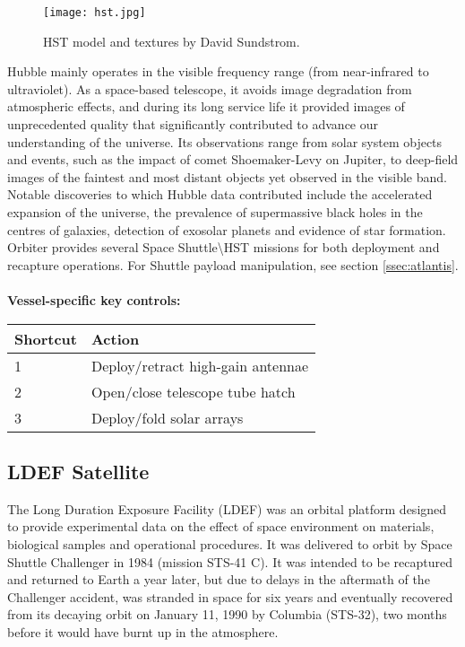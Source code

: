 \documentclass[Orbiter User Manual.tex]{subfiles}
\begin{document}
\begin{figure}[H]
  \centering
  \texttt{[image: hst.jpg]}
  \caption{HST model and textures by David Sundstrom.}
\end{figure}

\noindent
Hubble mainly operates in the visible frequency range (from near-infrared to ultraviolet). As a space-based telescope, it avoids image degradation from atmospheric effects, and during its long service life it provided images of unprecedented quality that significantly contributed to advance our understanding of the universe. Its observations range from solar system objects and events, such as the impact of comet Shoemaker-Levy on Jupiter, to deep-field images of the faintest and most distant objects yet observed in the visible band. Notable discoveries to which Hubble data contributed include the accelerated expansion of the universe, the prevalence of supermassive black holes in the centres of galaxies, detection of exosolar planets and evidence of star formation.\\
Orbiter provides several Space Shuttle\textbackslash HST missions for both deployment and recapture operations. For Shuttle payload manipulation, see section \ref{ssec:atlantis}.\\
\\
\textbf{Vessel-specific key controls:}

	\begin{longtable}{ |p{}|p{}| }
	\hline\rule{0pt}{2ex}
	\textbf{Shortcut} & \textbf{Action}\\
	\hline\rule{0pt}{2ex}
	1 & Deploy/retract high-gain antennae\\
	\hline\rule{0pt}{2ex}
	2 & Open/close telescope tube hatch\\
	\hline\rule{0pt}{2ex}
	3 & Deploy/fold solar arrays\\
	\hline
	\end{longtable}


\subsection{LDEF Satellite}
The Long Duration Exposure Facility (LDEF) was an orbital platform designed to provide experimental data on the effect of space environment on materials, biological samples and operational procedures. It was delivered to orbit by Space Shuttle Challenger in 1984 (mission STS-41 C). It was intended to be recaptured and returned to Earth a year later, but due to delays in the aftermath of the Challenger accident, was stranded in space for six years and eventually recovered from its decaying orbit on January 11, 1990 by Columbia (STS-32), two months before it would have burnt up in the atmosphere.
\end{document}
